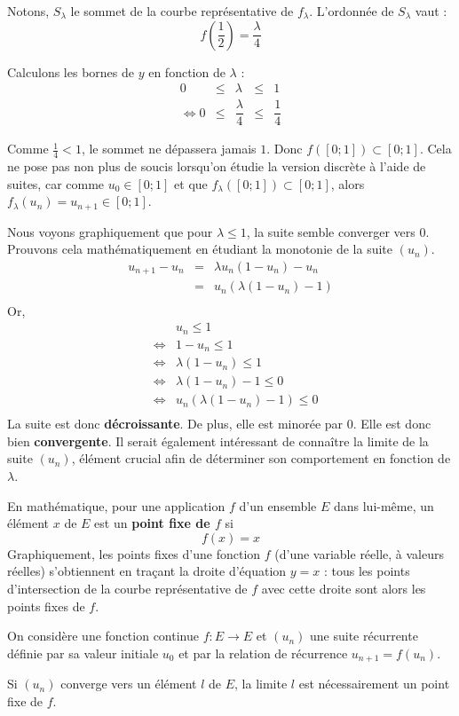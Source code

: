 Notons, $S_\lambda$ le sommet de la courbe représentative de $f_\lambda$. L'ordonnée de $S_\lambda$ vaut :
\[
    f\left(\dfrac{1}{2}\right) = \dfrac{\lambda}{4}
\]

Calculons les bornes de $y$ en fonction de $\lambda$ :
\[
    \begin{array}{rcccl}
        0 &\leq& \lambda &\leq& 1 \\
        \Longleftrightarrow 0 &\leq& \dfrac{\lambda}{4} &\leq& \dfrac{1}{4}
    \end{array}
\]

Comme $\frac{1}{4} < 1$, le sommet ne dépassera jamais $1$. Donc $\boxed{f([0;1]) \subset[0;1]}$. Cela ne pose pas non plus de soucis lorsqu'on étudie la version discrète à l'aide de suites, car comme $u_0 \in[0;1]$ et que $f_\lambda([0;1])\subset[0;1]$, alors $f_\lambda(u_n) = u_{n+1}\in[0;1]$.


Nous voyons graphiquement que pour $\lambda \leq 1$, la suite semble converger vers $0$. Prouvons cela mathématiquement en étudiant la monotonie de la suite $(u_n)$.
$$
    \begin{array}{rcl}
        u_{n+1}-u_n &=& \lambda u_n(1-u_n)-u_n \\
                    &=& u_n(\lambda(1-u_n)-1) \\
    \end{array}
$$
Or,
$$
    \begin{array}{rcl}
        &&u_n \leq 1 \\
        &\Longleftrightarrow& 1 - u_n \leq 1 \\
        &\Longleftrightarrow& \lambda(1 - u_n) \leq 1 \\
        &\Longleftrightarrow& \lambda(1 - u_n) - 1 \leq 0 \\
        &\Longleftrightarrow& u_n(\lambda(1 - u_n) - 1) \leq 0 \\
    \end{array}
$$
La suite est donc \textbf{décroissante}. De plus, elle est minorée par $0$. Elle est donc bien \textbf{convergente}. Il serait également intéressant de connaître la limite de la suite $(u_n)$, élément crucial afin de déterminer son comportement en fonction de $\lambda$.
\begin{axiome}
    En mathématique, pour une application $f$ d'un ensemble $E$ dans lui-même, un élément $x$ de $E$ est un \textbf{point fixe de $f$} si
    \[
        f(x) = x  
    \]
    Graphiquement, les points fixes d'une fonction $f$ (d'une variable réelle, à valeurs réelles) s'obtiennent en traçant la droite d'équation $y = x$ : tous les points d'intersection de la courbe représentative de $f$ avec cette droite sont alors les points fixes de $f$.
\end{axiome}
\begin{axiome}
    On considère une fonction continue $f : E \longrightarrow E$ et $(u_n)$ une suite récurrente définie par sa valeur initiale $u_0$ et par la relation de récurrence $u_{n+1} = f(u_n)$.
    
    Si $(u_n)$ converge vers un élément $l$ de $E$, la limite $l$ est nécessairement un point fixe de $f$.
\end{axiome}

